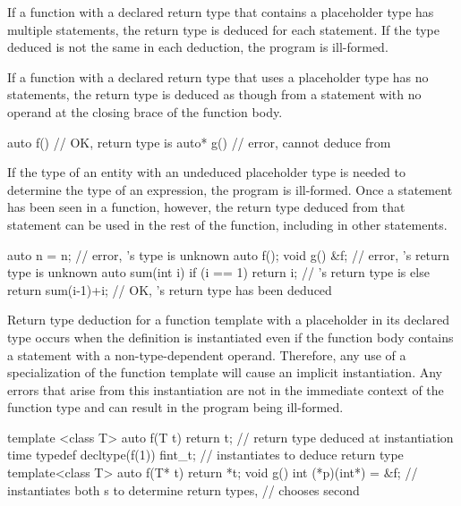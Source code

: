 \pnum
If a function with a declared return type that contains a placeholder type has
multiple  statements, the return type is deduced for each
 statement. If the type deduced is not the same in each
deduction, the program is ill-formed.

\pnum
If a function with a declared return type that uses a placeholder type has no
 statements, the return type is deduced as though from a
 statement with no operand at the closing brace of the function
body.
\enterexample
\begin{codeblock}
auto  f() { } // OK, return type is 
auto* g() { } // error, cannot deduce  from 
\end{codeblock}
\exitexample

\pnum
If the type of an entity with an undeduced placeholder type is needed to
determine the type of an expression, the program is ill-formed. Once a
 statement has been seen in a function, however, the return type deduced
from that statement can be used in the rest of the function, including in other
 statements.
\enterexample
\begin{codeblock}
auto n = n;            // error, 's type is unknown
auto f();
void g() { &f; }       // error, 's return type is unknown
auto sum(int i) {
  if (i == 1)
    return i;          // 's return type is 
  else
    return sum(i-1)+i; // OK, 's return type has been deduced
}
\end{codeblock}
\exitexample

\pnum
Return type deduction for a function template with a placeholder in its
declared type occurs when the definition is instantiated even if the function
body contains a  statement with a non-type-dependent operand.
\enternote Therefore, any use of a specialization of the function template will
cause an implicit instantiation. Any errors that arise from this instantiation
are not in the immediate context of the function type and can result in the
program being ill-formed. \exitnote
\enterexample
\begin{codeblock}
template <class T> auto f(T t) { return t; }  // return type deduced at instantiation time
typedef decltype(f(1)) fint_t;                // instantiates  to deduce return type
template<class T> auto f(T* t) { return *t; }
void g() { int (*p)(int*) = &f; }             // instantiates both s to determine return types,
                                              // chooses second
\end{codeblock}
\exitexample

